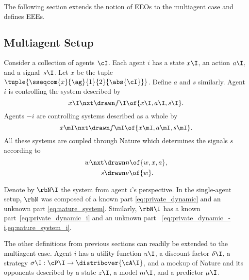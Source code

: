 The following section extends the notion of EEOs to the multiagent case and defines EEEs.

\subsection{Multiagent Setup}

Consider a collection of agents \(\cI\).
Each agent \(i\) has a state \(x\I\), an action \(a\I\), and a signal~\(s\I\).
Let \(x\) be the tuple \(\tuple{\sseqcom{x}{\ag}{1}{2}{\abs{\cI}}}\).
Define \(a\) and \(s\) similarly.
Agent \(i\) is controlling the system described by
\begin{equation}
\label{eq:private_dynamic_i}
x\I\nxt \drawn  f\I \of{x\I, a\I, s\I}.
\end{equation}
Agents \(-i\) are controlling systems described as a whole by
\begin{equation}
\label{eq:private_dynamic_-i}
x\mI\nxt \drawn  f\mI \of{x\mI, a\mI, s\mI}.
\end{equation}
All these systems are coupled through Nature which determines the signals \(s\) according to
\begin{subequations}
\label{eq:nature_system_i}
\begin{align}
\label{eq:nature_dynamic_i}
w\nxt &\drawn n \of{w, x, a}, \\
\label{eq:nature_signal_i}
s &\drawn \nu \of{w}.
\end{align}
\end{subequations}

Denote by \(\rbN\I\) the system from agent \(i\)'s perspective.
In the single-agent setup, \(\rbN\) was composed of a known part \cref{eq:private_dynamic} and an unknown part \cref{eq:nature_system}.
Similarly, \(\rbN\I\) has a known part~\cref{eq:private_dynamic_i} and an unknown part~ \cref{eq:private_dynamic_-i,eq:nature_system_i}.

The other definitions from previous sections can readily be extended to the multiagent case.
Agent \(i\) has a utility function \(u\I\), a discount factor \(\delta\I\), a strategy \(\sigma\I : \cP\I \to \distribover{\cA\I}\), and a mockup of Nature and its opponents described by a state \(z\I\), a model \(m\I\), and a predictor \(\mu\I\).

